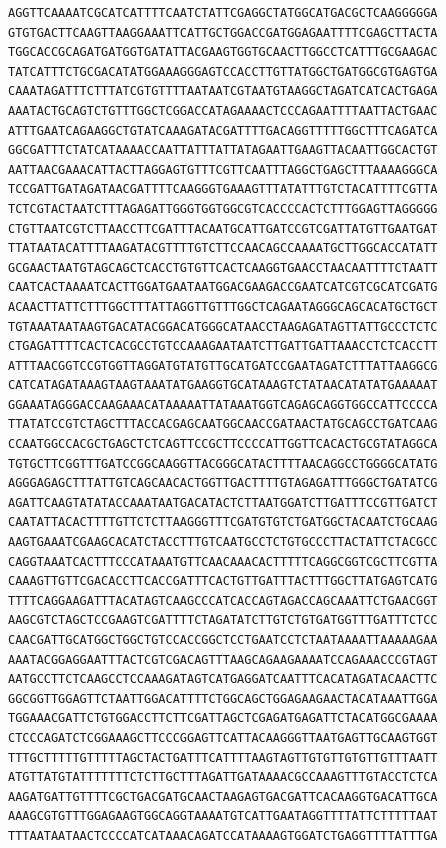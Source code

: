\documentclass[a4paper]{article}
\begin{document}
\begin{verbatim}
AGGTTCAAAATCGCATCATTTTCAATCTATTCGAGGCTATGGCATGACGCTCAAGGGGGA
GTGTGACTTCAAGTTAAGGAAATTCATTGCTGGACCGATGGAGAATTTTCGAGCTTACTA
TGGCACCGCAGATGATGGTGATATTACGAAGTGGTGCAACTTGGCCTCATTTGCGAAGAC
TATCATTTCTGCGACATATGGAAAGGGAGTCCACCTTGTTATGGCTGATGGCGTGAGTGA
CAAATAGATTTCTTTATCGTGTTTTAATAATCGTAATGTAAGGCTAGATCATCACTGAGA
AAATACTGCAGTCTGTTTGGCTCGGACCATAGAAAACTCCCAGAATTTTAATTACTGAAC
ATTTGAATCAGAAGGCTGTATCAAAGATACGATTTTGACAGGTTTTTGGCTTTCAGATCA
GGCGATTTCTATCATAAAACCAATTATTTATTATAGAATTGAAGTTACAATTGGCACTGT
AATTAACGAAACATTACTTAGGAGTGTTTCGTTCAATTTAGGCTGAGCTTTAAAAGGGCA
TCCGATTGATAGATAACGATTTTCAAGGGTGAAAGTTTATATTTGTCTACATTTTCGTTA
TCTCGTACTAATCTTTAGAGATTGGGTGGTGGCGTCACCCCACTCTTTGGAGTTAGGGGG
CTGTTAATCGTCTTAACCTTCGATTTACAATGCATTGATCCGTCGATTATGTTGAATGAT
TTATAATACATTTTAAGATACGTTTTGTCTTCCAACAGCCAAAATGCTTGGCACCATATT
GCGAACTAATGTAGCAGCTCACCTGTGTTCACTCAAGGTGAACCTAACAATTTTCTAATT
CAATCACTAAAATCACTTGGATGAATAATGGACGAAGACCGAATCATCGTCGCATCGATG
ACAACTTATTCTTTGGCTTTATTAGGTTGTTTGGCTCAGAATAGGGCAGCACATGCTGCT
TGTAAATAATAAGTGACATACGGACATGGGCATAACCTAAGAGATAGTTATTGCCCTCTC
CTGAGATTTTCACTCACGCCTGTCCAAAGAATAATCTTGATTGATTAAACCTCTCACCTT
ATTTAACGGTCCGTGGTTAGGATGTATGTTGCATGATCCGAATAGATCTTTATTAAGGCG
CATCATAGATAAAGTAAGTAAATATGAAGGTGCATAAAGTCTATAACATATATGAAAAAT
GGAAATAGGGACCAAGAAACATAAAAATTATAAATGGTCAGAGCAGGTGGCCATTCCCCA
TTATATCCGTCTAGCTTTACCACGAGCAATGGCAACCGATAACTATGCAGCCTGATCAAG
CCAATGGCCACGCTGAGCTCTCAGTTCCGCTTCCCCATTGGTTCACACTGCGTATAGGCA
TGTGCTTCGGTTTGATCCGGCAAGGTTACGGGCATACTTTTAACAGGCCTGGGGCATATG
AGGGAGAGCTTTATTGTCAGCAACACTGGTTGACTTTTGTAGAGATTTGGGCTGATATCG
AGATTCAAGTATATACCAAATAATGACATACTCTTAATGGATCTTGATTTCCGTTGATCT
CAATATTACACTTTTGTTCTCTTAAGGGTTTCGATGTGTCTGATGGCTACAATCTGCAAG
AAGTGAAATCGAAGCACATCTACCTTTGTCAATGCCTCTGTGCCCTTACTATTCTACGCC
CAGGTAAATCACTTTCCCATAAATGTTCAACAAACACTTTTTCAGGCGGTCGCTTCGTTA
CAAAGTTGTTCGACACCTTCACCGATTTCACTGTTGATTTACTTTGGCTTATGAGTCATG
TTTTCAGGAAGATTTACATAGTCAAGCCCATCACCAGTAGACCAGCAAATTCTGAACGGT
AAGCGTCTAGCTCCGAAGTCGATTTTCTAGATATCTTGTCTGTGATGGTTTGATTTCTCC
CAACGATTGCATGGCTGGCTGTCCACCGGCTCCTGAATCCTCTAATAAAATTAAAAAGAA
AAATACGGAGGAATTTACTCGTCGACAGTTTAAGCAGAAGAAAATCCAGAAACCCGTAGT
AATGCCTTCTCAAGCCTCCAAAGATAGTCATGAGGATCAATTTCACATAGATACAACTTC
GGCGGTTGGAGTTCTAATTGGACATTTTCTGGCAGCTGGAGAAGAACTACATAAATTGGA
TGGAAACGATTCTGTGGACCTTCTTCGATTAGCTCGAGATGAGATTCTACATGGCGAAAA
CTCCCAGATCTCGGAAAGCTTCCCGGAGTTCATTACAAGGGTTAATGAGTTGCAAGTGGT
TTTGCTTTTTGTTTTTAGCTACTGATTTCATTTTAAGTAGTTGTGTTGTGTTGTTTAATT
ATGTTATGTATTTTTTTCTCTTGCTTTAGATTGATAAAACGCCAAAGTTTGTACCTCTCA
AAGATGATTGTTTTCGCTGACGATGCAACTAAGAGTGACGATTCACAAGGTGACATTGCA
AAAGCGTGTTTGGAGAAGTGGCAGGTAAAATGTCATTGAATAGGTTTTATTCTTTTTAAT
TTTAATAATAACTCCCCATCATAAACAGATCCATAAAAGTGGATCTGAGGTTTTATTTGA

\end{verbatim}
\end{document}
